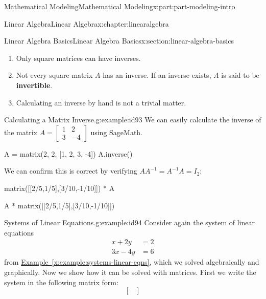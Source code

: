\documentclass[oneside,10pt,]{book}
\newcommand{\xreffont}{\relax}
\newcommand{\terminology}[1]{\textbf{#1}}
\numberwithin{equation}{section}
\begin{document}
\begin{partptx}{Mathematical Modeling}{}{Mathematical Modeling}{}{}{x:part:part-modeling-intro}
\begin{chapterptx}{Linear Algebra}{}{Linear Algebra}{}{}{x:chapter:linearalgebra}
\begin{sectionptx}{Linear Algebra Basics}{}{Linear Algebra Basics}{}{}{x:section:linear-algebra-basics}
%
\begin{enumerate}
\item{}Only square matrices can have inverses.%
\item{}Not every square matrix \(A\) has an inverse. If an inverse exists, \(A\) is said to be \terminology{invertible}.%
\item{}Calculating an inverse by hand is not a trivial matter.%
\end{enumerate}
\begin{example}{Calculating a Matrix Inverse.}{g:example:id93}%
We can easily calculate the inverse of the matrix \(A=\begin{bmatrix} 1 & 2 \\ 3 & -4 
\end{bmatrix}\) using SageMath.%
\begin{sageinput}
A = matrix(2, 2, [1, 2, 3, -4])
A.inverse()
\end{sageinput}
\begin{sageoutput}
[  2/5   1/5]
[ 3/10 -1/10]
\end{sageoutput}
We can confirm this is correct by verifying \(AA^{-1}=A^{-1}A=I_2\):%
\begin{sageinput}
matrix([[2/5,1/5],[3/10,-1/10]]) * A
\end{sageinput}
\begin{sageoutput}
[1 0]
[0 1]
\end{sageoutput}
\begin{sageinput}
A * matrix([[2/5,1/5],[3/10,-1/10]])
\end{sageinput}
\begin{sageoutput}
[1 0]
[0 1]
\end{sageoutput}
\end{example}
\begin{example}{Systems of Linear Equations.}{g:example:id94}%
Consider again the system of linear equations%
%
\begin{equation*}
\begin{aligned}
x + 2y &= 2 \\
3x - 4y & = 6
\end{aligned}
\end{equation*}
from \hyperref[x:example:systems-linear-eqns]{Example~{\xreffont\ref{x:example:systems-linear-eqns}}}, which we solved algebraically and graphically. Now we show how it can be solved with matrices. First we write the system in the following matrix form:%
%
\begin{equation*}
\begin{bmatrix}

\end{bmatrix}
\end{equation*}
\end{example}
\end{sectionptx}
\end{chapterptx}
\end{partptx}
\end{document}
